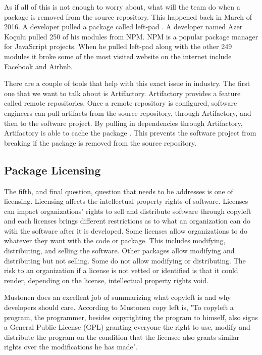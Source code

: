 \documentclass[journal]{IEEEtran}
\begin{document}
As if all of this is not enough to worry about, what will the team do when a package is removed from the source repository. This happened back in March of 2016. A developer pulled a package called left-pad \cite{Williams_tweet_btn()}. A developer named Azer Koçulu pulled 250 of his modules from NPM. NPM is a popular package manager for JavaScript projects. When he pulled left-pad along with the other 249 modules it broke some of the most visited website on the internet include Facebook and Airbnb\cite{Haney_2016}. 

There are a couple of tools that help with this exact issue in industry. The first one that we want to talk about is Artifactory. Artifactory provides a feature called remote repositories. Once a remote repository is configured, software engineers can pull artifacts from the source repository, through Artifactory, and then to the software project. By pulling in dependencies through Artifactory, Artifactory is able to cache the package \cite{Remote}. This prevents the software project from breaking if the package is removed from the source repository. 

\subsection{Package Licensing}
The fifth, and final question, question that needs to be addresses is one of licensing. Licensing affects the intellectual property rights of software. Licenses can impact organizations’ rights to sell and distribute software through copyleft and each licenses brings different restrictions as to what an organization can do with the software after it is developed. Some licenses allow organizations to do whatever they want with the code or package. This includes modifying, distributing, and selling the software. Other packages allow modifying and distributing but not selling. Some do not allow modifying or distributing. The risk to an organization if a license is not vetted or identified is that it could render, depending on the license, intellectual property rights void. 

Mustonen does an excellent job of summarizing what copyleft is and why developers should care. According to Mustonen copy left is, "To copyleft a program, the programmer, besides copyrighting the program to himself, also signs a General Public License (GPL) granting everyone the right to use, modify and distribute the program on the condition that the licensee also grants similar rights over the modifications he has made"\cite{Mustonen_2003}. 
\end{document}
